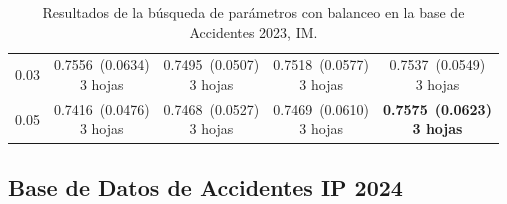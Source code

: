 \documentclass[twoside,a4paper,12pt,onecolumn,openany]{book}
\begin{document}
\begin{table}[H]
\begin{tabular}{r|cccc}
0.03 & \shortstack{0.7556~(0.0634)\\ 3 hojas} & \shortstack{0.7495~(0.0507)\\ 3 hojas} & \shortstack{0.7518~(0.0577)\\ 3 hojas} & \shortstack{0.7537~(0.0549)\\ 3 hojas} \\[4pt]
0.05 & \shortstack{0.7416~(0.0476)\\ 3 hojas} & \shortstack{0.7468~(0.0527)\\ 3 hojas} & \shortstack{0.7469~(0.0610)\\ 3 hojas} & \shortstack{\textbf{0.7575}~\textbf{(0.0623)}\\ \textbf{3 hojas}} \\[4pt]
\bottomrule
\end{tabular}
\caption{Resultados de la búsqueda de parámetros con balanceo en la base de Accidentes 2023, IM.}
\label{tab:busqueda_acc_im_2023}
\end{table}
 
\vspace{0.0cm}
 
\subsection*{Base de Datos de Accidentes IP 2024}
 
\end{document}
